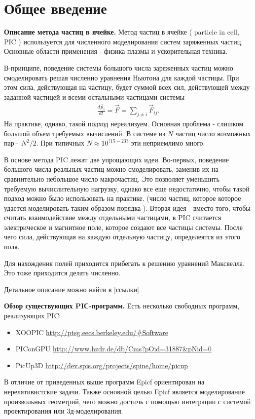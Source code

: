 \section{Общее введение}
\textbf{ Описание метода частиц в ячейке. }
Метод частиц в ячейке ( particle in cell, PIC ) используется для 
численного моделирования систем заряженных частиц. 
Основные области применения - физика плазмы и ускорительная техника.

В-принципе, поведение системы большого числа заряженных 
частиц можно смоделировать решая численно уравнения Ньютона для каждой частицы.
При этом сила, действующая на частицу, будет суммой всех сил,
действующей между заданной частицей и всеми остальными частицами системы
\begin{gather}
  \frac{ d \vec{p}_i }{ dt } = \vec{F} = \sum_{j \neq i} \vec{F}_{ij}.
\end{gather}
На практике, однако, такой подход нереализуем. Основная проблема - слишком
большой объем требуемых вычислений. 
В системе из $N$ частиц число возможных пар - $N^2/2$.
При типичных $N \approx 10^{?15-23?}$ эти неприемлимо много.

В основе метода PIC лежат две упрощающих идеи. 
Во-первых, поведение большого числа реальных частиц можно 
смоделировать, заменив их на сравнительно небольшое число макрочастиц. 
Это позволяет уменьшить требуемую вычислительную нагрузку, однако все еще
недостаточно, чтобы такой подход можно было использовать на практике.
(число частиц, которое которое удается моделировать таким образом порядка  ).
Вторая идея - вместо того, чтобы считать взаимодействие между отдельными 
частицами, в PIC считается электрическое и магнитное поле, которое
создают все частицы системы. После чего сила, действующая на каждую отдельную
частицу, определеятся из этого поля. 

Для нахождения полей приходится прибегать к решению уравнений Максвелла.
Это тоже приходится делать численно. 

Детальное описание можно найти в [ссылки]

\textbf{Обзор существующих PIС-программ.}
Есть несколько свободных программ, реализующих PIC:

\begin{itemize}
\item XOOPIC \url{http://ptsg.eecs.berkeley.edu/#Software}
\item PIConGPU \url{http://www.hzdr.de/db/Cms?pOid=31887&pNid=0}
\item PicUp3D \url{http://dev.spis.org/projects/spine/home/picup}
\end{itemize}

В отличие от приведенных выше программ Epicf ориентирован на нерелятивистские задачи.
Также основной целью Epicf является моделирование произвольных геометрий,
чего можно достичь с помощью интеграции с системой проектирования или 3д-моделирования.

